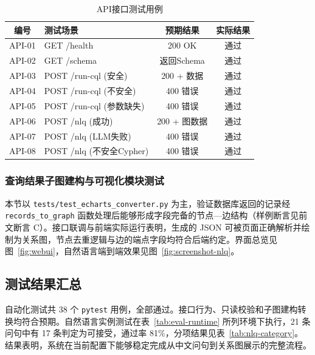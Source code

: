 \documentclass[12pt,a4paper]{article}
\begin{document}
\begin{table}[H]
    \centering
    \caption{API接口测试用例}
    \label{tab:api-test}
    \begin{tabular}{clcc}
        \toprule
        \textbf{编号} & \textbf{测试场景} & \textbf{预期结果} & \textbf{实际结果} \\
        \midrule
        API-01 & GET /health & 200 OK & 通过 \\
        API-02 & GET /schema & 返回Schema & 通过 \\
        API-03 & POST /run-cql (安全) & 200 + 数据 & 通过 \\
        API-04 & POST /run-cql (不安全) & 400 错误 & 通过 \\
        API-05 & POST /run-cql (参数缺失) & 400 错误 & 通过 \\
        API-06 & POST /nlq (成功) & 200 + 图数据 & 通过 \\
        API-07 & POST /nlq (LLM失败) & 400 错误 & 通过 \\
        API-08 & POST /nlq (不安全Cypher) & 400 错误 & 通过 \\
        \bottomrule
    \end{tabular}
\end{table}

\subsubsection{查询结果子图建构与可视化模块测试}

本节以 \texttt{tests/test\_echarts\_converter.py} 为主，验证数据库返回的记录经 \texttt{records\_to\_graph} 函数处理后能够形成字段完备的节点—边结构（样例断言见前文断言 C）。接口联调与前端实际运行表明，生成的 JSON 可被页面正确解析并绘制为关系图，节点去重逻辑与边的端点字段均符合后端约定。界面总览见图~\ref{fig:webui}，自然语言端到端效果见图~\ref{fig:screenshot-nlq}。

\subsection{测试结果汇总}

自动化测试共 38 个 \texttt{pytest} 用例，全部通过。接口行为、只读校验和子图建构转换均符合预期。自然语言实例测试在表~\ref{tab:eval-runtime} 所列环境下执行，21 条问句中有 17 条判定为可接受，通过率 81\%，分项结果见表~\ref{tab:nlq-category}。结果表明，系统在当前配置下能够稳定完成从中文问句到关系图展示的完整流程。
\end{document}
